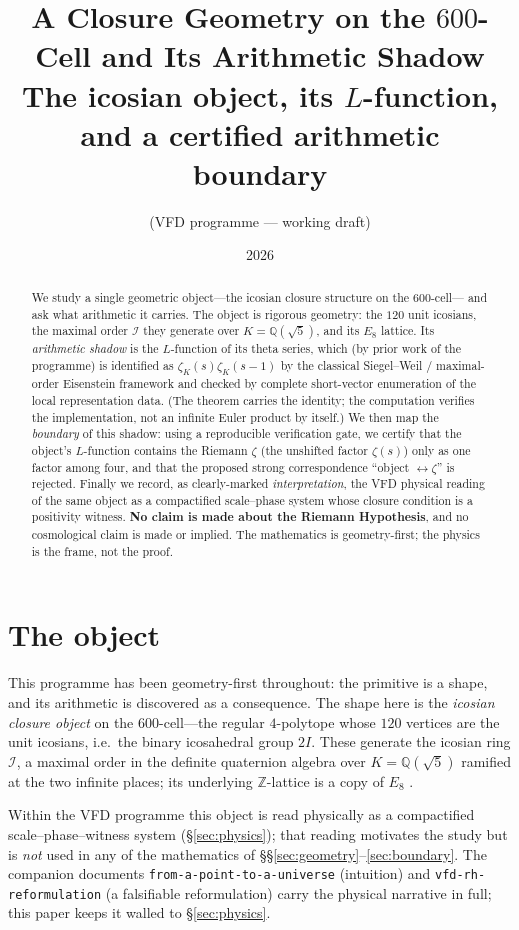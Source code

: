 \documentclass[11pt]{article}
\title{A Closure Geometry on the $600$-Cell and Its Arithmetic Shadow\\
\large The icosian object, its $L$-function, and a certified arithmetic boundary}
\author{(VFD programme --- working draft)}
\date{2026}
\theoremstyle{definition}
\newcommand{\Z}{\mathbb{Z}}
\newcommand{\Q}{\mathbb{Q}}
\newcommand{\zetaK}{\zeta_{K}}
\newcommand{\Icos}{\mathcal{I}}
\begin{document}
\maketitle

\begin{abstract}
We study a single geometric object---the icosian closure structure on the $600$-cell---
and ask what arithmetic it carries. The object is rigorous geometry: the $120$ unit
icosians, the maximal order $\Icos$ they generate over $K=\Q(\sqrt5)$, and its $E_8$
lattice. Its \emph{arithmetic shadow} is the $L$-function of its theta series, which
(by prior work of the programme) is identified as $\zetaK(s)\zetaK(s-1)$ by the classical
Siegel--Weil / maximal-order Eisenstein framework and checked by complete short-vector
enumeration of the local representation data. (The theorem carries the identity; the
computation verifies the implementation, not an infinite Euler product by itself.) We then map the \emph{boundary} of this shadow: using a reproducible
verification gate, we certify that the object's $L$-function contains the Riemann
$\zeta$ (the unshifted factor $\zeta(s)$) only as one factor among four, and that the
proposed strong correspondence ``object $\leftrightarrow\zeta$'' is rejected. Finally we record, as clearly-marked
\emph{interpretation}, the VFD physical reading of the same object as a compactified
scale--phase system whose closure condition is a positivity witness. \textbf{No claim
is made about the Riemann Hypothesis}, and no cosmological claim is made or implied.
The mathematics is geometry-first; the physics is the frame, not the proof.
\end{abstract}

\section{The object}\label{sec:object}
This programme has been geometry-first throughout: the primitive is a shape, and its
arithmetic is discovered as a consequence. The shape here is the \emph{icosian closure
object} on the $600$-cell---the regular $4$-polytope whose $120$ vertices are the unit
icosians, i.e.\ the binary icosahedral group $2I$. These generate the icosian ring
$\Icos$, a maximal order in the definite quaternion algebra over $K=\Q(\sqrt5)$ ramified
at the two infinite places; its underlying $\Z$-lattice is a copy of $E_8$
\cite{ConwaySloane}.

Within the VFD programme this object is read physically as a compactified
scale--phase--witness system (\S\ref{sec:physics}); that reading motivates the study but
is \emph{not} used in any of the mathematics of \S\S\ref{sec:geometry}--\ref{sec:boundary}.
The companion documents \texttt{from-a-point-to-a-universe} (intuition) and
\texttt{vfd-rh-reformulation} (a falsifiable reformulation) carry the physical narrative
in full; this paper keeps it walled to \S\ref{sec:physics}.
\end{document}
